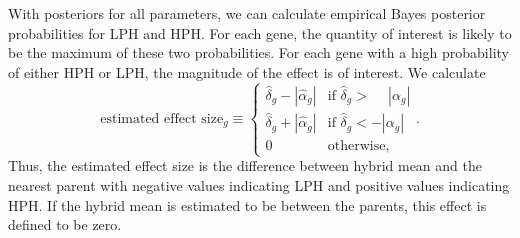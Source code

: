 \documentclass[useAMS,usenatbib,referee]{biom}
\begin{document}
With posteriors for all parameters, we can calculate empirical Bayes posterior probabilities for LPH and HPH. For each gene, the quantity of interest is likely to be the maximum of these two probabilities. For each gene with a high probability of either HPH or LPH, the magnitude of the effect is of interest. We calculate 
\begin{equation}
\mbox{estimated effect size}_g \equiv \left\{ 
\begin{array}{ll}
\hat{\delta}_g - |\hat{\alpha}_g| & \mbox{if } \hat{\delta}_g > \phantom{-}|\alpha_g| \\
\hat{\delta}_g + |\hat{\alpha}_g| & \mbox{if } \hat{\delta}_g < -|\alpha_g| \\
0 & \mbox{otherwise},
\end{array}.
\right. 
\label{e:effect_size}
\end{equation}
Thus, the estimated effect size is the difference between hybrid mean and the nearest parent with negative values indicating LPH and positive values indicating HPH. If the hybrid mean is estimated to be between the parents, this effect is defined to be zero. 
\end{document}
